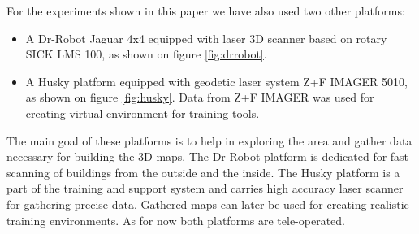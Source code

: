 \documentclass{article}
\begin{document}
For the experiments shown in this paper we have also used two other platforms:
\begin{itemize}
\item A Dr-Robot Jaguar 4x4 equipped with laser 3D scanner based on rotary SICK LMS 100, as shown on figure \ref{fig:drrobot}.
\item A Husky platform equipped with geodetic laser system Z+F IMAGER 5010, as shown on figure \ref{fig:husky}. Data from Z+F IMAGER was used for creating virtual environment for training tools.
\end{itemize}
The main goal of these platforms is to help in exploring the area and gather data necessary for building the 3D maps.
The Dr-Robot platform is dedicated for fast scanning of buildings from the outside and the inside.
The Husky platform is a part of the training and support system and carries high accuracy laser scanner for gathering precise data.
Gathered maps can later be used for creating realistic training environments.
As for now both platforms are tele-operated.
\end{document}
